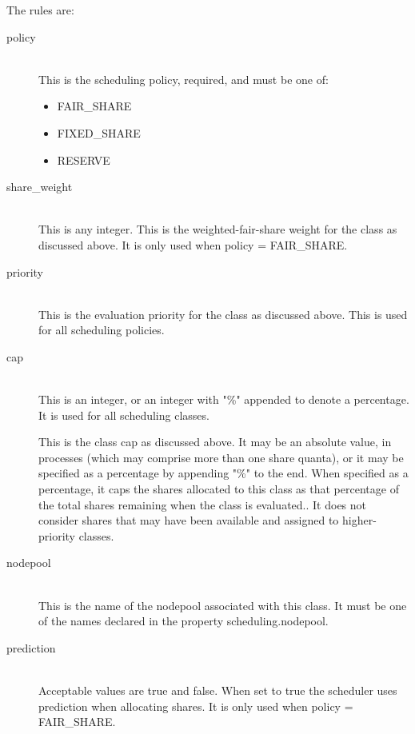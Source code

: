       The rules are: 
      \begin{description}

        \item[policy] \hfill \\
          This is the scheduling policy, required, and must be one of: 
          \begin{itemize}
            \item[] FAIR\_SHARE 
            \item[] FIXED\_SHARE 
            \item[] RESERVE 
          \end{itemize}
            
        \item[share\_weight] \hfill \\
          This is any integer. This is the weighted-fair-share weight for the class as discussed above. It is 
          only used when policy = FAIR\_SHARE. 

        \item[priority] \hfill \\
          This is the evaluation priority for the class as discussed above. This is used for all scheduling 
          policies. 

        \item[cap] \hfill \\
          This is an integer, or an integer with "\%" appended to denote a percentage. It is used for all 
          scheduling classes. 

          This is the class cap as discussed above. It may be an absolute value, in processes (which may 
          comprise more than one share quanta), or it may be specified as a percentage by appending 
          "\%" to the end. When specified as a percentage, it caps the shares allocated to this class as 
          that percentage of the total shares remaining when the class is evaluated.. It does not consider 
          shares that may have been available and assigned to higher-priority classes. 

        \item[nodepool] \hfill \\
          This is the name of the nodepool associated with this class. It must be one of the names 
          declared in the property scheduling.nodepool. 

        \item[prediction] \hfill \\
          Acceptable values are true and false. When set to true the scheduler uses prediction when 
          allocating shares. It is only used when policy = FAIR\_SHARE. 


\end{description}

